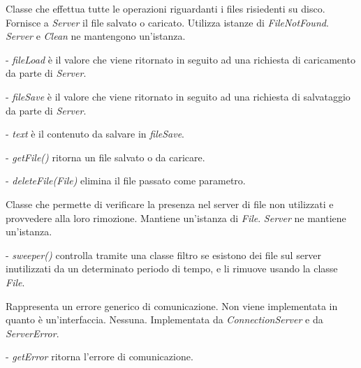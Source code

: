 Classe che effettua tutte le operazioni riguardanti i files risiedenti su disco. Fornisce a \textit{Server} il file salvato o caricato. 
Utilizza istanze di \textit{FileNotFound}.
\textit{Server} e \textit{Clean} ne mantengono un'istanza.
\begin{elencopuntato}[\subsubsecindent]
\item[-] \textit{fileLoad} \`e il valore che viene ritornato in seguito ad una richiesta di caricamento da parte di \textit{Server}.
\item[-] \textit{fileSave} \`e il valore che viene ritornato in seguito ad una richiesta di salvataggio da parte di \textit{Server}.
\item[-] \textit{text} \`e il contenuto da salvare in \textit{fileSave}.
\end{elencopuntato}
\begin{elencopuntato}[\subsubsecindent]
\item[-] \textit{getFile()} ritorna un file salvato o da caricare.
\item[-] \textit{deleteFile(File)} elimina il file passato come parametro.
\end{elencopuntato}


Classe che permette di verificare la presenza nel server di file non utilizzati e provvedere alla loro rimozione.
Mantiene un'istanza di \textit{File}.
\textit{Server} ne mantiene un'istanza.
\begin{elencopuntato}[\subsubsecindent]
\item[-] \textit{sweeper()} controlla tramite una classe filtro se esistono dei file sul server inutilizzati da un determinato periodo di tempo, e li rimuove usando la classe \textit{File}.
\end{elencopuntato}

Rappresenta un errore generico di comunicazione. Non viene implementata in quanto \`e un'interfaccia. 
Nessuna.
Implementata da \textit{ConnectionServer} e da \textit{ServerError}.
\begin{elencopuntato}[\subsubsecindent]
\item[-] \textit{getError} ritorna l'errore di comunicazione.
\end{elencopuntato}


